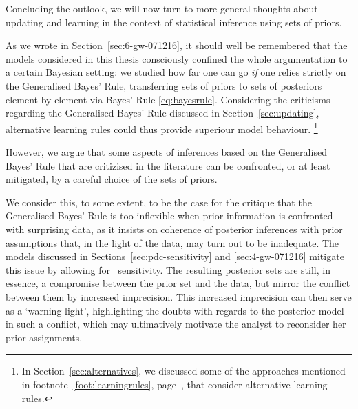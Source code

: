 \medskip

Concluding the outlook, we will now turn to more general thoughts about updating and learning
in the context of statistical inference using sets of priors.


As we wrote in Section~\ref{sec:6-gw-071216},
it should well be remembered that the models considered in this thesis
consciously confined the whole argumentation to a certain Bayesian setting:
we studied how far one can go \emph{if} one relies strictly on the Generalised Bayes' Rule,
transferring sets of priors to sets of posteriors element by element via Bayes' Rule \eqref{eq:bayesrule}.
Considering the criticisms regarding the Generalised Bayes' Rule discussed in Section~\ref{sec:updating},
alternative learning rules could thus provide superiour model behaviour.%
\footnote{In Section~\ref{sec:alternatives}, we discussed some of the approaches
mentioned in footnote~\ref{foot:learningrules}, page~\pageref{foot:learningrules},
that consider alternative learning rules.}

However, we argue that some aspects of inferences based on the Generalised Bayes' Rule that are critizised
in the literature
can be confronted, or at least mitigated, by a careful choice of the sets of priors.

We consider this, to some extent, to be the case for the critique that 
the Generalised Bayes' Rule is too inflexible when prior information is confronted with surprising data,
as it insists on coherence of posterior inferences with prior assumptions that,
in the light of the data, may turn out to be inadequate.
The models discussed in Sections~\ref{sec:pdc-sensitivity} and \ref{sec:4-gw-071216}
mitigate this issue by allowing for \pdc\ sensitivity.
The resulting posterior sets are still, in essence, a compromise between the prior set and the data,
but mirror the conflict between them by increased imprecision.
This increased imprecision can then serve as a `warning light',
highlighting the doubts with regards to the posterior model in such a conflict,
which may ultimatively motivate the analyst to reconsider her prior assignments.

